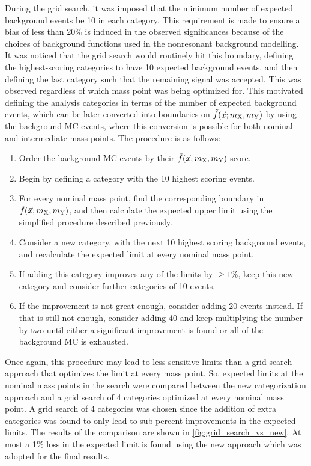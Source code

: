 During the grid search, it was imposed that the minimum number of expected background events be 10 in each category. This requirement is made to ensure a bias of less than 20\% is induced in the observed significances because of the choices of background functions used in the nonresonant background modelling. It was noticed that the grid search would routinely hit this boundary, defining the highest-scoring categories to have 10 expected background events, and then defining the last category such that the remaining signal was accepted. This was observed regardless of which mass point was being optimized for. This motivated defining the analysis categories in terms of the number of expected background events, which can be later converted into boundaries on $\tilde{f}(\vec{x}; m_{\mathrm{X}}, m_{\mathrm{Y}})$ by using the background MC events, where this conversion is possible for both nominal and intermediate mass points. The procedure is as follows:
\begin{enumerate}
    \item Order the background MC events by their $\tilde{f}(\vec{x}; m_{\mathrm{X}}, m_{\mathrm{Y}})$ score.
    \item Begin by defining a category with the 10 highest scoring events.
    \item For every nominal mass point, find the corresponding boundary in $\tilde{f}(\vec{x}; m_{\mathrm{X}}, m_{\mathrm{Y}})$, and then calculate the expected upper limit using the simplified procedure described previously.
    \item Consider a new category, with the next 10 highest scoring background events, and recalculate the expected limit at every nominal mass point.
    \item If adding this category improves any of the limits by $\geq 1\%$, keep this new category and consider further categories of 10 events.
    \item If the improvement is not great enough, consider adding 20 events instead. If that is still not enough, consider adding 40 and keep multiplying the number by two until either a significant improvement is found or all of the background MC is exhausted.
\end{enumerate}

Once again, this procedure may lead to less sensitive limits than a grid search approach that optimizes the limit at every mass point. So, expected limits at the nominal mass points in the \XTwoHH search were compared between the new categorization approach and a grid search of 4 categories optimized at every nominal mass point. A grid search of 4 categories was chosen since the addition of extra categories was found to only lead to sub-percent improvements in the expected limits. The results of the comparison are shown in \cref{fig:grid_search_vs_new}. At most a 1\% loss in the expected limit is found using the new approach which was adopted for the final results.

